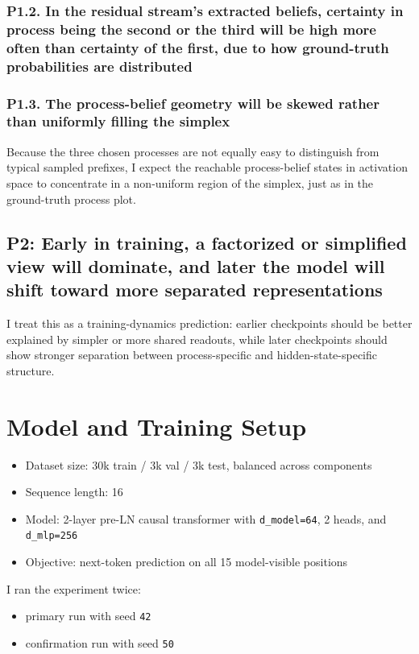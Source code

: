 \documentclass[11pt]{article}
\begin{document}
\subsubsection*{P1.2. In the residual stream's extracted beliefs, certainty in process being the second or the third will be high more often than certainty of the first, due to how ground-truth probabilities are distributed}

\subsubsection*{P1.3. The process-belief geometry will be skewed rather than uniformly filling the simplex}

Because the three chosen processes are not equally easy to distinguish from typical sampled prefixes, I expect the reachable process-belief states in activation space to concentrate in a non-uniform region of the simplex, just as in the ground-truth process plot.

\subsection{P2: Early in training, a factorized or simplified view will dominate, and later the model will shift toward more separated representations}

I treat this as a training-dynamics prediction: earlier checkpoints should be better explained by simpler or more shared readouts, while later checkpoints should show stronger separation between process-specific and hidden-state-specific structure.

\section{Model and Training Setup}

\begin{itemize}
  \item Dataset size: 30k train / 3k val / 3k test, balanced across components
  \item Sequence length: 16
  \item Model: 2-layer pre-LN causal transformer with \texttt{d\_model=64}, 2 heads, and \texttt{d\_mlp=256}
  \item Objective: next-token prediction on all 15 model-visible positions
\end{itemize}

I ran the experiment twice:

\begin{itemize}
  \item primary run with seed \texttt{42}
  \item confirmation run with seed \texttt{50}
\end{itemize}
\end{document}

